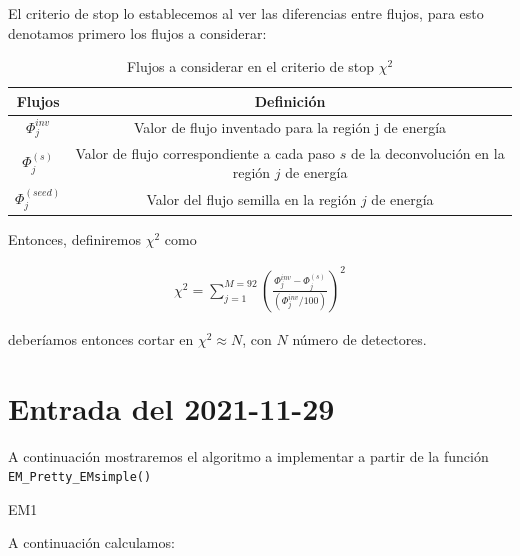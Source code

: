 \documentclass[11pt,letterpaper]{article}
\begin{document}
El criterio de stop lo establecemos al ver las diferencias entre flujos, para esto denotamos primero los flujos a considerar:


\begin{table}[H]
\centering
\begin{tabular}{|c|c|}
\hline
\textbf{Flujos} & \textbf{Definición}  \\ 
\hline
$\Phi_j^{inv}$ & Valor de flujo inventado para la región j de energía \\
$\Phi_j^{(s)}$ & Valor de flujo correspondiente a cada paso $s$ de la deconvolución en la región $j$ de energía  \\
$\Phi_j^{(seed)}$& Valor del flujo semilla en la región $j$ de energía  \\
\hline
\end{tabular}
\caption{Flujos a considerar en el criterio de stop $\chi^2$}
\end{table}


Entonces, definiremos $\chi^2$ como 

\begin{align}
\chi^2 = \sum_{j=1}^{M=92}\left( \frac{\Phi_j^{inv} -\Phi_j^{(s)}}{(\Phi_j^{inv}/100)} \right)^2
\end{align}

deberíamos entonces cortar en $\chi^2 \approx N$, con $N$ número de detectores.

\section{Entrada del 2021-11-29}
\label{2021-11-29}

A continuación mostraremos el algoritmo a implementar a partir de la función \verb|EM_Pretty_EMsimple()|


\begin{algorithm}[H]\label{em1}
\caption{EM1\label{EM1}}
\end{algorithm}

A continuación calculamos:
\end{document}
